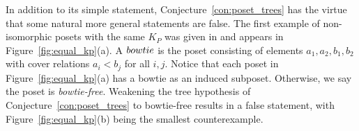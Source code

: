 \documentclass[ALCO,Unicode,published]{cedram}
\begin{document}
\begin{remark}
In addition to its simple statement, Conjecture~\ref{con:poset_trees} has the virtue that some natural more general statements are false.  The first example of non-isomorphic posets with the same $K_P$ was given in \cite{McWa14} and appears in Figure~\ref{fig:equal_kp}(a).  A $\emph{bowtie}$ is the poset consisting of elements $a_1,a_2,b_1,b_2$ with cover relations $a_i < b_j$ for all $i,j$.  Notice that each poset in Figure~\ref{fig:equal_kp}(a) has a bowtie as an induced subposet.  Otherwise, we say the poset is \emph{bowtie-free}.  Weakening the tree hypothesis of Conjecture~\ref{con:poset_trees} to bowtie-free results in a false statement, with Figure~\ref{fig:equal_kp}(b) being the smallest counterexample.
\begin{figure}
\begin{center}
\end{center}
\end{figure}
\end{remark}
\end{document}
